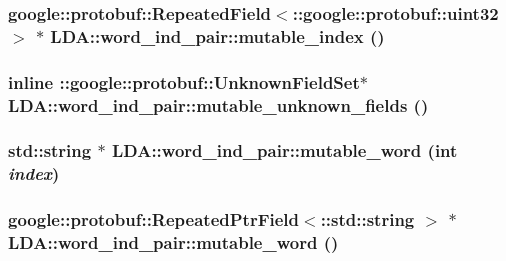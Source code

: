 \label{class_l_d_a_1_1word__ind__pair_acb159c0917346581889e7a6dbb66a197}
\hypertarget{class_l_d_a_1_1word__ind__pair_a172a7eabc0a9639556467c29325161d9}{
\subsubsection[{mutable\_\-index}]{\setlength{\rightskip}{0pt plus 5cm}google::protobuf::RepeatedField$<$::google::protobuf::uint32 $>$ $\ast$ LDA::word\_\-ind\_\-pair::mutable\_\-index ()}}
\label{class_l_d_a_1_1word__ind__pair_a172a7eabc0a9639556467c29325161d9}
\hypertarget{class_l_d_a_1_1word__ind__pair_ad0e15294e5b2b76ce48db1026ed9b3b3}{
\subsubsection[{mutable\_\-unknown\_\-fields}]{\setlength{\rightskip}{0pt plus 5cm}inline ::google::protobuf::UnknownFieldSet$\ast$ LDA::word\_\-ind\_\-pair::mutable\_\-unknown\_\-fields ()}}
\label{class_l_d_a_1_1word__ind__pair_ad0e15294e5b2b76ce48db1026ed9b3b3}
\hypertarget{class_l_d_a_1_1word__ind__pair_a28ace99ba274e58b4b5520975375b73b}{
\subsubsection[{mutable\_\-word}]{\setlength{\rightskip}{0pt plus 5cm}std::string $\ast$ LDA::word\_\-ind\_\-pair::mutable\_\-word (int {\em index})}}
\label{class_l_d_a_1_1word__ind__pair_a28ace99ba274e58b4b5520975375b73b}
\hypertarget{class_l_d_a_1_1word__ind__pair_afdcfa1f1e319fbc394c671ad94eb4f09}{
\subsubsection[{mutable\_\-word}]{\setlength{\rightskip}{0pt plus 5cm}google::protobuf::RepeatedPtrField$<$::std::string $>$ $\ast$ LDA::word\_\-ind\_\-pair::mutable\_\-word ()}}
